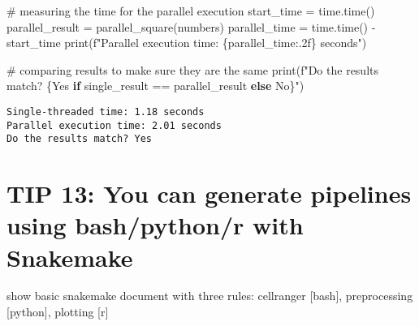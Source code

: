 \documentclass[
  letterpaper,
  DIV=11,
  numbers=noendperiod]{scrartcl}
\newenvironment{Shaded}{\begin{snugshade}}{\end{snugshade}}
\newcommand{\BuiltInTok}[1]{\textcolor[rgb]{0.00,0.23,0.31}{#1}}
\newcommand{\CommentTok}[1]{\textcolor[rgb]{0.37,0.37,0.37}{#1}}
\newcommand{\ControlFlowTok}[1]{\textcolor[rgb]{0.00,0.23,0.31}{\textbf{#1}}}
\newcommand{\NormalTok}[1]{\textcolor[rgb]{0.00,0.23,0.31}{#1}}
\newcommand{\OperatorTok}[1]{\textcolor[rgb]{0.37,0.37,0.37}{#1}}
\newcommand{\SpecialCharTok}[1]{\textcolor[rgb]{0.37,0.37,0.37}{#1}}
\newcommand{\SpecialStringTok}[1]{\textcolor[rgb]{0.13,0.47,0.30}{#1}}
\newcommand{\StringTok}[1]{\textcolor[rgb]{0.13,0.47,0.30}{#1}}
\begin{document}
\begin{Shaded}
\begin{Highlighting}[]
    \CommentTok{\# measuring the time for the parallel execution}
\NormalTok{    start\_time }\OperatorTok{=}\NormalTok{ time.time()}
\NormalTok{    parallel\_result }\OperatorTok{=}\NormalTok{ parallel\_square(numbers)}
\NormalTok{    parallel\_time }\OperatorTok{=}\NormalTok{ time.time() }\OperatorTok{{-}}\NormalTok{ start\_time}
    \BuiltInTok{print}\NormalTok{(}\SpecialStringTok{f"Parallel execution time: }\SpecialCharTok{\{}\NormalTok{parallel\_time}\SpecialCharTok{:.2f\}}\SpecialStringTok{ seconds"}\NormalTok{)}
    
    \CommentTok{\# comparing results to make sure they are the same}
    \BuiltInTok{print}\NormalTok{(}\SpecialStringTok{f"Do the results match? }\SpecialCharTok{\{}\StringTok{\textquotesingle{}Yes\textquotesingle{}} \ControlFlowTok{if}\NormalTok{ single\_result }\OperatorTok{==}\NormalTok{ parallel\_result }\ControlFlowTok{else} \StringTok{\textquotesingle{}No\textquotesingle{}}\SpecialCharTok{\}}\SpecialStringTok{"}\NormalTok{)}
\end{Highlighting}
\end{Shaded}

\begin{verbatim}
Single-threaded time: 1.18 seconds
Parallel execution time: 2.01 seconds
Do the results match? Yes
\end{verbatim}

\section{TIP 13: You can generate pipelines using bash/python/r with
Snakemake}\label{tip-13-you-can-generate-pipelines-using-bashpythonr-with-snakemake}

show basic snakemake document with three rules: cellranger {[}bash{]},
preprocessing {[}python{]}, plotting {[}r{]}
\end{document}
